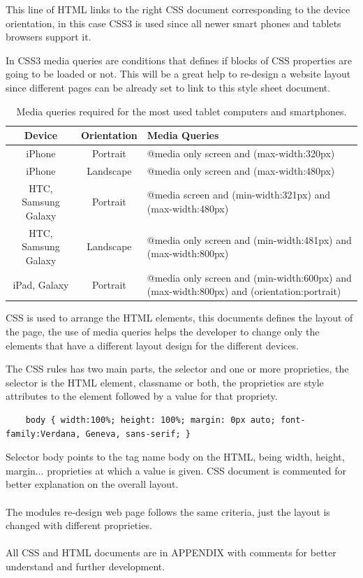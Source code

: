 This line of HTML links to the right CSS document corresponding to the device orientation, in this case CSS3 is used since all newer smart phones and tablets browsers support it.

In CSS3 media queries are conditions that defines if blocks of CSS properties are going to be loaded or not. This will be a great help to re-design a website layout since different pages can be already set to link to this style sheet document. \\
\begin{table}[!h]
	\begin{tabular}{| c | c | p{10.5cm} |}
	\hline
	\textbf{Device} & \textbf{Orientation} & \textbf{Media Queries} \\ \hline
	iPhone & Portrait & @media only screen and (max-width:320px)\\ \hline
	iPhone & Landscape & @media only screen and (max-width:480px)\\ \hline
	HTC, Samsung Galaxy & Portrait & @media screen and (min-width:321px) and (max-width:480px)\\ \hline
	HTC, Samsung Galaxy & Landscape & @media only screen and (min-width:481px) and (max-width:800px)\\ \hline
	iPad, Galaxy & Portrait & @media only screen and (min-width:600px) and (max-width:800px) and (orientation:portrait)\\ \hline
	\end{tabular}
	\caption{Media queries required for the most used tablet computers and smartphones.}
\end{table}

CSS is used to arrange the HTML elements, this documents defines the layout of the page, the use of media queries helps the developer to change only the elements that have a different layout design for the different devices.

The CSS rules has two main parts, the selector and one or more proprieties, the selector is the HTML element, classname or both, the proprieties are style attributes to the element followed by a value for that propriety.

\begin{lstlisting}
	body { width:100%; height: 100%; margin: 0px auto; font-family:Verdana, Geneva, sans-serif; }
\end{lstlisting}

Selector body points to the tag name body on the HTML, being width, height, margin... proprieties at which a value is given.
CSS document is commented for better explanation on the overall layout. 
\\
\\The modules re-design web page follows the same criteria, just the layout is changed with different proprieties.
\\
\\All CSS and HTML documents are in APPENDIX with comments for better understand and further development.
